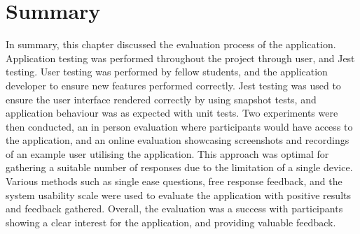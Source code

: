 \section{Summary}

In summary, this chapter discussed the evaluation process of the application. Application testing was performed throughout the project through user, and Jest testing. User testing was performed by fellow students, and the application developer to ensure new features performed correctly. Jest testing was used to ensure the user interface rendered correctly by using snapshot tests, and application behaviour was as expected with unit tests. Two experiments were then conducted, an in person evaluation where participants would have access to the application, and an online evaluation showcasing screenshots and recordings of an example user utilising the application. This approach was optimal for gathering a suitable number of responses due to the limitation of a single device. Various methods such as single ease questions, free response feedback, and the system usability scale were used to evaluate the application with positive results and feedback gathered. Overall, the evaluation was a success with participants showing a clear interest for the application, and providing valuable feedback. 
